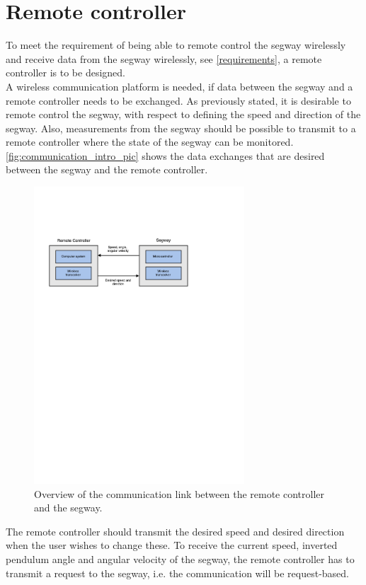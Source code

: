 \chapter{Remote controller}
To meet the requirement of being able to remote control the segway wirelessly and receive data from the segway wirelessly, see \autoref{requirements}, a remote controller is to be designed.\\
A wireless communication platform is needed, if data between the segway and a remote controller needs to be exchanged. As previously stated, it is desirable to remote control the segway, with respect to defining the speed and direction of the segway. Also, measurements from the segway should be possible to transmit to a remote controller where the state of the segway can be monitored. \autoref{fig:communication_intro_pic} shows the data exchanges that are desired between the segway and the remote controller.
\begin{figure}[H]
	\centering
	\includegraphics[width=0.7\textwidth]{figures/communication_intro_pic.pdf}
	\caption{Overview of the communication link between the remote controller and the segway.}
	\label{fig:communication_intro_pic}
\end{figure}
The remote controller should transmit the desired speed and desired direction when the user wishes to change these. To receive the current speed, inverted pendulum angle and angular velocity of the segway, the remote controller has to transmit a request to the segway, i.e. the communication will be request-based.

